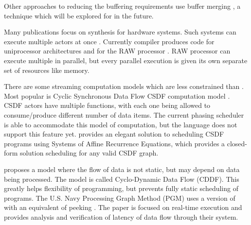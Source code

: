 Other approaches to reducing the buffering requirements use buffer
merging \cite{murthy99buffer}, a technique which will be explored
for {\StreamIt} in the future.

Many publications focus on synthesis for hardware systems.  Such
systems can execute multiple actors at once
\cite{govindarajan-minimizing}.  Currently {\StreamIt} compiler
produces code for uniprocessor architectures \cite{streamittech2}
and for the RAW processor \cite{gordo-thesis}.  RAW processor can
execute multiple {\filters} in parallel, but every parallel
execution is given its own separate set of resources like memory.

There are some streaming computation models which are less
constrained than {\SDF}. Most popular is Cyclic Synchronous Data Flow
CSDF computation model \cite{parks95comparison}.  CSDF actors have
multiple {\work} functions, with each one being allowed to
consume/produce different number of data items. The current
{\StreamIt} phasing scheduler is able to accommodate this model of
computation, but the {\StreamIt} language does not support this
feature yet. \cite{streamittech3} provides an elegant solution to
scheduling CSDF programs using Systems of Affine Recurrence
Equations, which provides a closed-form solution scheduling for
any valid CSDF graph.

\cite{wauters96cyclodynamic} proposes a model where the flow of
data is not static, but may depend on data being processed. The
model is called Cyclo-Dynamic Data Flow (CDDF). This greatly helps
flexibility of programming, but prevents fully static scheduling
of programs. The U.S. Navy Processing Graph Method (PGM) uses a
version of {\SDF} with an equivalent of peeking \cite{goddard00navy}.
The paper is focused on real-time execution and provides analysis
and verification of latency of data flow through their system.
